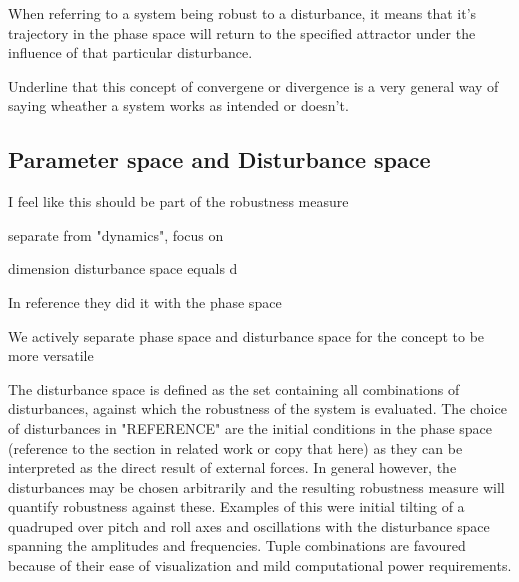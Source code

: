 
     
     

    When referring to a system being robust to a disturbance, it means that it's trajectory in the phase space will return to the specified attractor under the influence of that particular disturbance. 

    Underline that this concept of convergene or divergence is a very general way of saying wheather a system works as intended or doesn't. 

\subsection{ Parameter space and Disturbance space}
    
    
    I feel like this should be part of the robustness measure

    separate from "dynamics", focus on 

    dimension disturbance space equals d

    In reference they did it with the phase space  

    We actively separate phase space and disturbance space for the concept to be more versatile

    The disturbance space is defined as the set containing all combinations of disturbances, against which the robustness of the system is evaluated. The choice of disturbances in "REFERENCE" are the initial conditions in the phase space (reference to the section in related work or copy that here) as they can be interpreted as the direct result of external forces. In general however, the disturbances may be chosen arbitrarily and the resulting robustness measure will quantify robustness against these. Examples of this were initial tilting of a quadruped over pitch and roll axes and oscillations with the disturbance space spanning the amplitudes and frequencies. Tuple combinations are favoured because of their ease of visualization and mild computational power requirements.  

